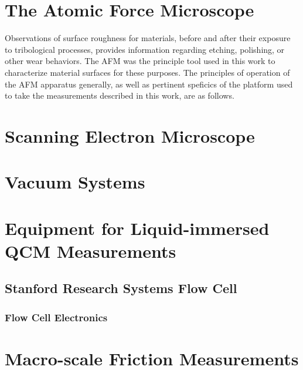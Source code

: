 \section{The Atomic Force Microscope}

Observations of surface roughness for materials, before and after their exposure to tribological processes, provides information regarding etching, polishing, or other wear behaviors. The AFM was the principle tool used in this work to characterize material surfaces for these purposes. The principles of operation of the AFM apparatus generally, as well as pertinent speficics of the platform used to take the measurements described in this work, are as follows.



\section{Scanning Electron Microscope}




\section{Vacuum Systems}









\section{Equipment for Liquid-immersed QCM Measurements}



\subsection{Stanford Research Systems Flow Cell}



\subsubsection{Flow Cell Electronics}




\section{Macro-scale Friction Measurements}



